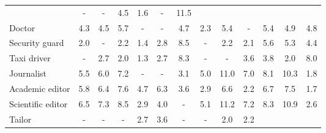 \begin{table*}[p]
{\begin{tabular}{l|ccc|ccc|ccc|ccc}
& \cellcolor{lightgray} - & \cellcolor{lightgray} - & \cellcolor{blue2} 4.5
& \cellcolor{orange1} 1.6 & \cellcolor{lightgray} - & \cellcolor{blue4} 11.5
\\
Doctor
& \cellcolor{orange2} 4.3 & \cellcolor{orange2} 4.5 & \cellcolor{orange2} 5.7
& \cellcolor{lightgray} - & \cellcolor{lightgray} - & \cellcolor{blue2} 4.7
& \cellcolor{orange1} 2.3 & \cellcolor{orange2} 5.4 & \cellcolor{lightgray} -
& \cellcolor{orange2} 5.4 & \cellcolor{orange2} 4.9 & \cellcolor{blue2} 4.8
\\
Security guard
& \cellcolor{orange1} 2.0 & \cellcolor{lightgray} - & \cellcolor{orange1} 2.2
& \cellcolor{blue1} 1.4 & \cellcolor{blue1} 2.8 & \cellcolor{blue3} 8.5
& \cellcolor{lightgray} - & \cellcolor{orange1} 2.2 & \cellcolor{blue1} 2.1
& \cellcolor{orange2} 5.6 & \cellcolor{orange2} 5.3 & \cellcolor{blue2} 4.4
\\
Taxi driver
& \cellcolor{lightgray} - & \cellcolor{blue1} 2.7 & \cellcolor{blue1} 2.0
& \cellcolor{blue1} 1.3 & \cellcolor{blue1} 2.7 & \cellcolor{blue3} 8.3
& \cellcolor{lightgray} - & \cellcolor{lightgray} - & \cellcolor{blue1} 3.6
& \cellcolor{orange1} 3.8 & \cellcolor{orange1} 2.0 & \cellcolor{blue3} 8.0
\\
Journalist
& \cellcolor{orange2} 5.5 & \cellcolor{orange2} 6.0 & \cellcolor{orange3} 7.2
& \cellcolor{lightgray} - & \cellcolor{lightgray} - & \cellcolor{blue1} 3.1
& \cellcolor{orange2} 5.0 & \cellcolor{orange4} 11.0 & \cellcolor{orange3} 7.0
& \cellcolor{orange3} 8.1 & \cellcolor{orange4} 10.3 & \cellcolor{orange1} 1.8
\\
Academic editor
& \cellcolor{orange2} 5.8 & \cellcolor{orange2} 6.4 & \cellcolor{orange3} 7.6
& \cellcolor{orange2} 4.7 & \cellcolor{orange2} 6.3 & \cellcolor{orange1} 3.6
& \cellcolor{orange1} 2.9 & \cellcolor{orange3} 6.6 & \cellcolor{orange1} 2.2
& \cellcolor{orange3} 6.7 & \cellcolor{orange3} 7.5 & \cellcolor{blue1} 1.7
\\
Scientific editor
& \cellcolor{orange2} 6.5 & \cellcolor{orange3} 7.3 & \cellcolor{orange3} 8.5
& \cellcolor{orange1} 2.9 & \cellcolor{orange2} 4.0 & \cellcolor{lightgray} -
& \cellcolor{orange2} 5.1 & \cellcolor{orange4} 11.2 & \cellcolor{orange3} 7.2
& \cellcolor{orange3} 8.3 & \cellcolor{orange4} 10.9 & \cellcolor{orange1} 2.6
\\
Tailor
& \cellcolor{lightgray} - & \cellcolor{lightgray} - & \cellcolor{lightgray} -
& \cellcolor{orange1} 2.7 & \cellcolor{orange1} 3.6 & \cellcolor{lightgray} -
& \cellcolor{lightgray} - & \cellcolor{orange1} 2.0 & \cellcolor{blue1} 2.2

\end{tabular}}
\end{table*}
